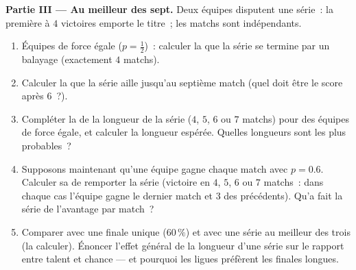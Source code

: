 \begin{problem}
\medskip
\noindent\textbf{Partie III --- Au meilleur des sept.}
Deux équipes disputent une série~: la première à $4$ victoires
emporte le titre~; les matchs sont indépendants.
\begin{enumerate}[resume]
  \item Équipes de force égale ($p = \frac12$)~: calculer la
         que la série se termine par un balayage
        (exactement $4$ matchs).
  \item Calculer la  que la série aille jusqu'au
        septième match (quel doit être le score après $6$~?).
  \item Compléter la  de la longueur de la série ($4$, $5$, $6$
        ou $7$ matchs) pour des équipes de force égale, et calculer
        la longueur espérée. Quelles longueurs sont les plus
        probables~?
  \item Supposons maintenant qu'une équipe gagne chaque match avec
        $p = 0.6$. Calculer sa  de remporter la série
        (victoire en $4$, $5$, $6$ ou $7$ matchs~: dans chaque cas
        l'équipe gagne le dernier match et $3$ des précédents).
        Qu'a fait la série de l'avantage par match~?
  \item Comparer avec une finale unique ($60\,\%$) et avec une série
        au meilleur des trois (la calculer). Énoncer l'effet général
        de la longueur d'une série sur le rapport entre talent et
        chance --- et pourquoi les ligues préfèrent les finales
        longues.
\end{enumerate}


\end{problem}
